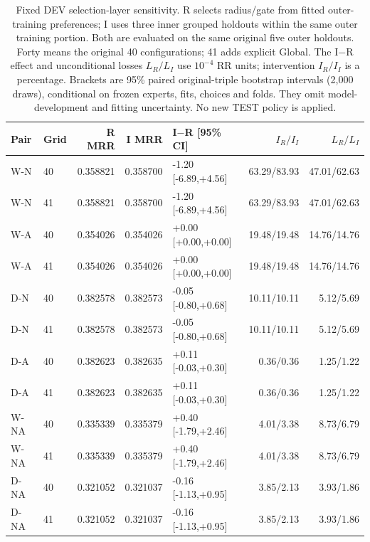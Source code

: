 \begin{table}[htbp]
\centering\footnotesize\setlength{\tabcolsep}{3pt}
\caption{Fixed DEV selection-layer sensitivity. R selects radius/gate from fitted outer-training preferences; I uses three inner grouped holdouts within the same outer training portion. Both are evaluated on the same original five outer holdouts. Forty means the original 40 configurations; 41 adds explicit Global. The I$-$R effect and unconditional losses $L_R/L_I$ use $10^{-4}$ RR units; intervention $I_R/I_I$ is a percentage. Brackets are 95\% paired original-triple bootstrap intervals (2,000 draws), conditional on frozen experts, fits, choices and folds. They omit model-development and fitting uncertainty. No new TEST policy is applied.}
\label{tab:selection-dev}
\begin{tabular}{llrrlrr}
\toprule
Pair & Grid & R MRR & I MRR & I$-$R [95\% CI] & $I_R/I_I$ & $L_R/L_I$\\
\midrule
W-N & 40 & 0.358821 & 0.358700 & -1.20 [-6.89,+4.56] & 63.29/83.93 & 47.01/62.63\\
W-N & 41 & 0.358821 & 0.358700 & -1.20 [-6.89,+4.56] & 63.29/83.93 & 47.01/62.63\\
W-A & 40 & 0.354026 & 0.354026 & +0.00 [+0.00,+0.00] & 19.48/19.48 & 14.76/14.76\\
W-A & 41 & 0.354026 & 0.354026 & +0.00 [+0.00,+0.00] & 19.48/19.48 & 14.76/14.76\\
D-N & 40 & 0.382578 & 0.382573 & -0.05 [-0.80,+0.68] & 10.11/10.11 & 5.12/5.69\\
D-N & 41 & 0.382578 & 0.382573 & -0.05 [-0.80,+0.68] & 10.11/10.11 & 5.12/5.69\\
D-A & 40 & 0.382623 & 0.382635 & +0.11 [-0.03,+0.30] & 0.36/0.36 & 1.25/1.22\\
D-A & 41 & 0.382623 & 0.382635 & +0.11 [-0.03,+0.30] & 0.36/0.36 & 1.25/1.22\\
W-NA & 40 & 0.335339 & 0.335379 & +0.40 [-1.79,+2.46] & 4.01/3.38 & 8.73/6.79\\
W-NA & 41 & 0.335339 & 0.335379 & +0.40 [-1.79,+2.46] & 4.01/3.38 & 8.73/6.79\\
D-NA & 40 & 0.321052 & 0.321037 & -0.16 [-1.13,+0.95] & 3.85/2.13 & 3.93/1.86\\
D-NA & 41 & 0.321052 & 0.321037 & -0.16 [-1.13,+0.95] & 3.85/2.13 & 3.93/1.86\\
\bottomrule
\end{tabular}
\end{table}
